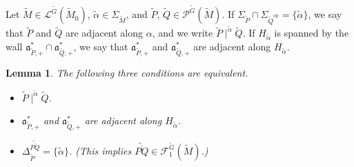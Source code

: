 \documentclass[12pt]{amsart}
\theoremstyle{definition}
\theoremstyle{plain}
\newtheorem{lemma}[definition]{Lemma}
\theoremstyle{remark}
\newcommand{\fa}{\mathfrak{a}}
\newcommand{\cF}{\mathcal{F}}
\newcommand{\cL}{\mathcal{L}}
\newcommand{\cP}{\mathcal{P}}
\numberwithin{equation}{section}
\newcommand{\tG}{\widetilde{G}}
\newcommand{\tM}{\widetilde{M}}
\newcommand{\tP}{\widetilde{P}}
\newcommand{\tQ}{\widetilde{Q}}
\newcommand{\op}{\mathrm{op}}
\newcommand{\talpha}{\widetilde{\alpha}}
\begin{document}
Let $\tM \in \cL^{\tG}(\tM_0)$, $\talpha\in\Sigma_{\tM}$, and $\tP$, $\tQ\in\cP^{\tG}(\tM)$. 
If $\Sigma_{\tP}\cap\Sigma_{\tQ^\op}=\{\talpha\}$, we say that $\tP$ and $\tQ$ are adjacent along $\alpha$, and we write $\tP\mid^{\talpha} \tQ$. 
If $H_{\talpha}$ is spanned by the wall $\fa^*_{\tP,+}\cap \fa^*_{\tQ,+}$, we say that $\fa^*_{\tP,+}$ and $\fa^*_{\tQ,+}$ are adjacent along $H_{\talpha}$. 
\begin{lemma}\label{lem:troot}
    The following three conditions are equivalent.
    \begin{itemize}
        \item[{\rm(i)}] $\tP \mid^{\talpha} \tQ$.
        \item[{\rm(ii)}] $\fa^*_{\tP,+}$ and $\fa^*_{\tQ,+}$ are adjacent along $H_{\talpha}$.
        \item[{\rm(iii)}] $\Delta_{\tP}^{\widetilde{\overline{PQ}}}=\{\talpha\}$. (This implies $\widetilde{\overline{PQ}}\in\cF^{\tG}_1(\tM)$.)
    \end{itemize}
\end{lemma}
\end{document}
